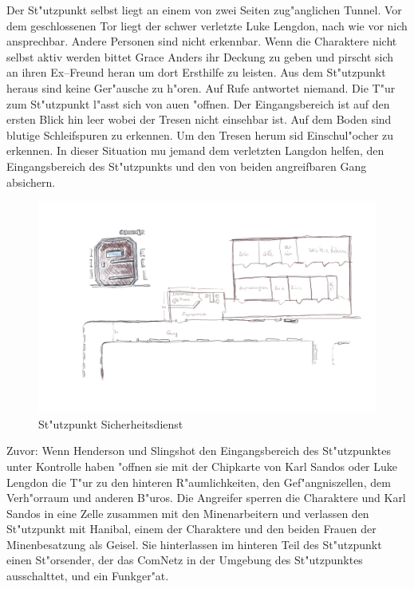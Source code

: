 Der St"utzpunkt selbst liegt an einem von zwei Seiten zug"anglichen Tunnel. Vor dem geschlossenen Tor liegt der schwer verletzte Luke Lengdon, nach wie vor nich ansprechbar. Andere Personen sind nicht erkennbar. Wenn die Charaktere nicht selbst aktiv werden bittet Grace Anders ihr Deckung zu geben und pirscht sich an ihren Ex--Freund heran um dort Ersthilfe zu leisten. Aus dem St"utzpunkt heraus sind keine Ger"ausche zu h"oren. Auf Rufe antwortet niemand. Die T"ur zum St"utzpunkt l"asst sich von au\3en "offnen. Der Eingangsbereich ist auf den ersten Blick hin leer wobei der Tresen nicht einsehbar ist. Auf dem Boden sind blutige Schleifspuren zu erkennen. Um den Tresen herum sid Einschu\3l"ocher zu erkennen. In dieser Situation mu\3 jemand dem verletzten Langdon helfen, den Eingangsbereich des St"utzpunkts und den von beiden angreifbaren Gang absichern. 

\begin{figure}
    \includegraphics[width=0.9\linewidth]{./images/sicherheitdienst.png}
    \caption{St"utzpunkt Sicherheitsdienst}
\end{figure}

Zuvor: Wenn Henderson und Slingshot den Eingangsbereich des St"utzpunktes unter Kontrolle haben "offnen sie mit der Chipkarte von Karl Sandos oder Luke Lengdon die T"ur zu den hinteren R"aumlichkeiten, den Gef"angniszellen, dem Verh"orraum und anderen B"uros. Die Angreifer sperren die Charaktere und Karl Sandos in eine Zelle zusammen mit den Minenarbeitern und verlassen den St"utzpunkt mit Hanibal, einem der Charaktere und den beiden Frauen der Minenbesatzung als Geisel. Sie hinterlassen im hinteren Teil des St"utzpunkt einen St"orsender, der das ComNetz in der Umgebung des St"utzpunktes ausschalttet, und ein Funkger"at.  

